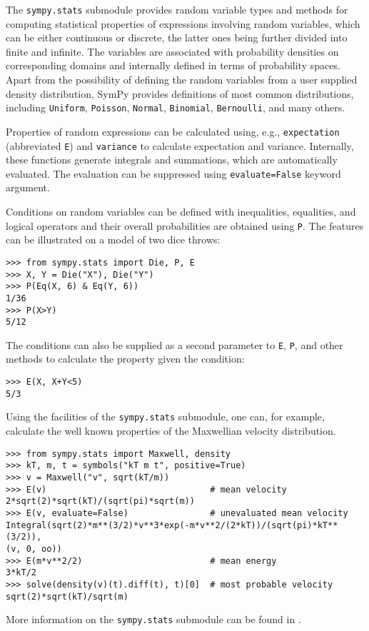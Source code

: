The \verb|sympy.stats| submodule provides random variable types and methods for
computing statistical properties of expressions involving random
variables, which can be either continuous or discrete, the latter ones being
further divided into finite and infinite. The variables are associated
with probability densities on corresponding domains and internally defined
in terms of probability spaces.
Apart from the possibility of defining the random variables from a user supplied
density distribution, SymPy provides definitions of most common
distributions, including \texttt{Uniform}, \texttt{Poisson}, \texttt{Normal},
\texttt{Binomial}, \texttt{Bernoulli}, and many others.

Properties of random expressions can be calculated using, e.g.,
\texttt{expectation} (abbreviated \texttt{E}) and \texttt{variance} to
calculate expectation and variance. Internally, these functions generate
integrals and summations, which are automatically evaluated. The evaluation
can be suppressed using \texttt{evaluate=False} keyword argument.

Conditions on random variables can be defined with inequalities, equalities,
and logical operators and their overall probabilities are obtained using
\texttt{P}. The features can be illustrated on a model of two dice throws:
\begin{verbatim}
>>> from sympy.stats import Die, P, E
>>> X, Y = Die("X"), Die("Y")
>>> P(Eq(X, 6) & Eq(Y, 6))
1/36
>>> P(X>Y)
5/12
\end{verbatim}
The conditions can also be supplied as a second parameter to \texttt{E},
\texttt{P}, and other methods to calculate the property given the condition:
\begin{verbatim}
>>> E(X, X+Y<5)
5/3
\end{verbatim}

Using the facilities of the \texttt{sympy.stats} submodule, one can, for
example, calculate
the well known properties of the Maxwellian velocity distribution.
\begin{verbatim}
>>> from sympy.stats import Maxwell, density
>>> kT, m, t = symbols("kT m t", positive=True)
>>> v = Maxwell("v", sqrt(kT/m))
>>> E(v)                                # mean velocity
2*sqrt(2)*sqrt(kT)/(sqrt(pi)*sqrt(m))
>>> E(v, evaluate=False)                # unevaluated mean velocity
Integral(sqrt(2)*m**(3/2)*v**3*exp(-m*v**2/(2*kT))/(sqrt(pi)*kT**(3/2)),
(v, 0, oo))
>>> E(m*v**2/2)                         # mean energy
3*kT/2
>>> solve(density(v)(t).diff(t), t)[0]  # most probable velocity
sqrt(2)*sqrt(kT)/sqrt(m)
\end{verbatim}

More information on the \texttt{sympy.stats} submodule can be found in
\cite{rocklin2012symbolic}.
